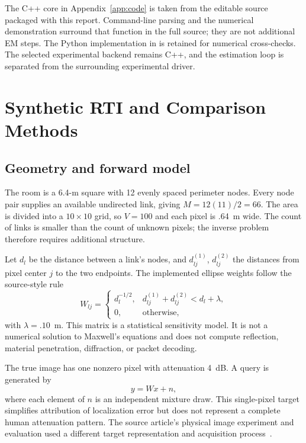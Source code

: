 \documentclass[conference,letterpaper]{IEEEtran}
\begin{document}
The C++ core in Appendix~\ref{app:code} is taken from the editable source packaged with this report. Command-line parsing and the numerical demonstration surround that function in the full source; they are not additional EM steps. The Python implementation in  is retained for numerical cross-checks. The selected experimental backend remains C++, and the estimation loop is separated from the surrounding experimental driver.

\section{Synthetic RTI and Comparison Methods}
\subsection{Geometry and forward model}
The room is a 6.4-m square with 12 evenly spaced perimeter nodes. Every node pair supplies an available undirected link, giving $M=12(11)/2=66$. The area is divided into a $10\times10$ grid, so $V=100$ and each pixel is .64~m wide. The count of links is smaller than the count of unknown pixels; the inverse problem therefore requires additional structure.

Let $d_l$ be the distance between a link's nodes, and $d_{lj}^{(1)}$, $d_{lj}^{(2)}$ the distances from pixel center $j$ to the two endpoints. The implemented ellipse weights follow the source-style rule
\begin{equation}
W_{lj}=\begin{cases}d_l^{-1/2},&d_{lj}^{(1)}+d_{lj}^{(2)}<d_l+\lambda,\\0,&\text{otherwise},\end{cases}
\end{equation}
with $\lambda=.10$~m. This matrix is a statistical sensitivity model. It is not a numerical solution to Maxwell's equations and does not compute reflection, material penetration, diffraction, or packet decoding.

The true image has one nonzero pixel with attenuation 4~dB. A query is generated by
\begin{equation}
y=Wx+n,
\label{eq:forward}
\end{equation}
where each element of $n$ is an independent mixture draw. This single-pixel target simplifies attribution of localization error but does not represent a complete human attenuation pattern. The source article's physical image experiment and evaluation used a different target representation and acquisition process~\cite{wilson2010}.
\end{document}
